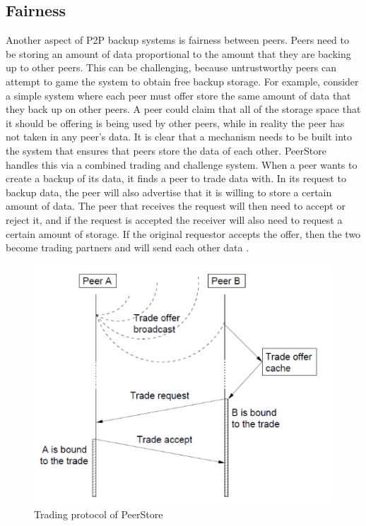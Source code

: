 \documentclass[12pt]{report}
\begin{document}
\subsection{Fairness}
Another aspect of P2P backup systems is fairness between peers. Peers need to be storing an amount of data proportional to the amount that they are backing up to other peers. This can be challenging, because untrustworthy peers can attempt to game the system to obtain free backup storage. For example, consider a simple system where each peer must offer store the same amount of data that they back up on other peers. A peer could claim that all of the storage space that it should be offering is being used by other peers, while in reality the peer has not taken in any peer's data. It is clear that a mechanism needs to be built into the system that ensures that peers store the data of each other. PeerStore handles this via a combined trading and challenge system. When a peer wants to create a backup of its data, it finds a peer to trade data with. In its request to backup data, the peer will also advertise that it is willing to store a certain amount of data. The peer that receives the request will then need to accept or reject it, and if the request is accepted the receiver will also need to request a certain amount of storage. If the original requestor accepts the offer, then the two become trading partners and will send each other data \cite{PeerStore}.

\begin{figure}
  \centering
  \includegraphics[scale=0.75]{PeerStoreTrading}
  \caption{Trading protocol of PeerStore}
\end{figure}
\end{document}
